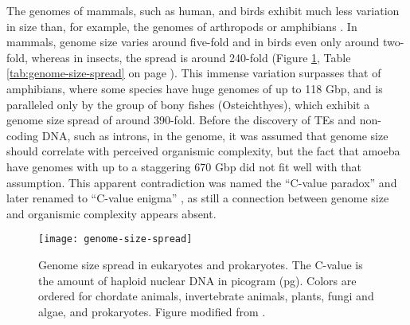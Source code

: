 The genomes of mammals, such as human, and birds exhibit much less
variation in size than, for example, the genomes of arthropods or 
amphibians \citep{Gregory2005}. In mammals, genome size varies around
five-fold and in birds even only around two-fold, whereas in insects,
the spread is around 240-fold (Figure \ref{fig:genome-size-spread}, Table
\ref{tab:genome-size-spread} on page \pageref{tab:genome-size-spread}). This
immense variation surpasses that of amphibians, where some species have huge
genomes of up to 118 Gbp, and is paralleled only by the group of bony fishes
(Osteichthyes), which exhibit a genome size spread of around 390-fold. Before
the discovery of TEs and non-coding DNA, such as introns, in the genome, it was
assumed that genome size should correlate with perceived organismic complexity,
but the fact that amoeba have genomes with up to a staggering 670 Gbp
\citep{Parfrey2008} did not fit well with that assumption. This apparent
contradiction was named the ``C-value paradox'' and later renamed to ``C-value
enigma'' \citep{Gregory2007a}, as still a connection between genome size and
organismic complexity appears absent.

\begin{figure}
\centering
\texttt{[image: genome-size-spread]}
\caption[Genome size spread in eukaryotes and prokaryotes]{Genome size spread
in eukaryotes and prokaryotes. The C-value is the amount of haploid nuclear DNA
in picogram (pg). Colors are ordered for chordate animals, invertebrate
animals, plants, fungi and algae, and prokaryotes. Figure modified from
\citet{Gregory2004}.}
\label{fig:genome-size-spread}
\end{figure}


